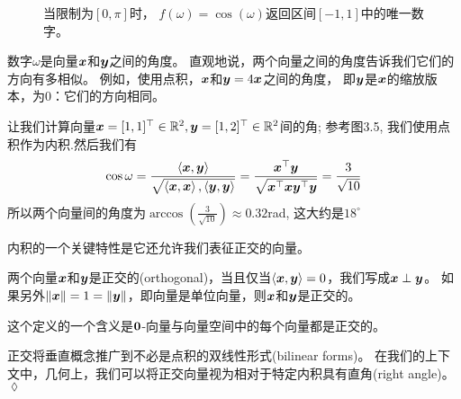 \begin{figure}
    \caption{
        当限制为$[0, \pi]$时，
        $f(\omega) = \cos(\omega)$返回区间$[−1, 1]$中的唯一数字。
    }
\end{figure}
数字$\omega$是向量$\boldsymbol{x}$和$\boldsymbol{y}$之间的角度。
直观地说，两个向量之间的角度告诉我们它们的方向有多相似。
例如，使用点积，$\boldsymbol{x}$和$\boldsymbol{y} = 4\boldsymbol{x}$之间的角度，
即$\boldsymbol{y}$是$\boldsymbol{x}$的缩放版本，为$0$：它们的方向相同。

\begin{example}[向量夹角]
    让我们计算向量$\boldsymbol{x} = [1,1]^\top \in \mathbb{R}^2,\boldsymbol{y} = [1,2]^\top \in \mathbb{R}^2$间的角;
    参考图3.5, 我们使用点积作为内积.然后我们有
    \begin{equation}
        \cos \omega =
        \frac{\left\langle\boldsymbol{x},\boldsymbol{y}\right\rangle}{\sqrt{\left\langle\boldsymbol{x},\boldsymbol{x}\right\rangle,\left\langle\boldsymbol{y},\boldsymbol{y}\right\rangle}}
        = \frac{\boldsymbol{x}^\top \boldsymbol{y}}{\sqrt{\boldsymbol{x}^\top\boldsymbol{x} \boldsymbol{y}^\top\boldsymbol{y}}}
        = \frac{3}{\sqrt{10}}
    \end{equation}
    所以两个向量间的角度为$\arccos(\frac{3}{\sqrt{10}}) \approx 0.32$rad,
    这大约是$18^\circ$
\end{example}

内积的一个关键特性是它还允许我们表征正交的向量。
\begin{definition}[正交]
    两个向量$\boldsymbol{x}$和$\boldsymbol{y}$是正交的(orthogonal)，当且仅当$\left\langle\boldsymbol{x},\boldsymbol{y}\right\rangle= 0$，我们写成$\boldsymbol{x} \perp \boldsymbol{y}$。
    如果另外$\|\boldsymbol{x}\| = 1 = \|\boldsymbol{y}\|$，即向量是单位向量，则$\boldsymbol{x}$和$\boldsymbol{y}$是正交的。
\end{definition}
这个定义的一个含义是$\boldsymbol{0}$-向量与向量空间中的每个向量都是正交的。
\begin{remark}
    正交将垂直概念推广到不必是点积的双线性形式(bilinear forms)。
    在我们的上下文中，几何上，我们可以将正交向量视为相对于特定内积具有直角(right angle)。
    \hfill $\lozenge$
\end{remark}

